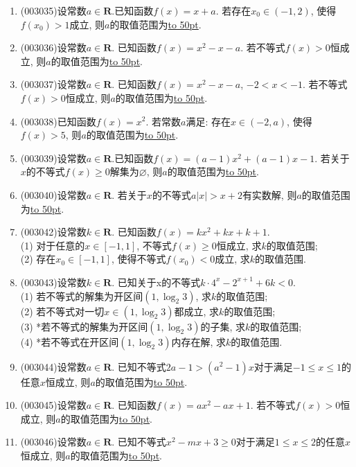 \documentclass[10pt,a4paper]{article}
\newcommand{\blank}[1]{\underline{\hbox to #1pt{}}}
\begin{document}
\begin{enumerate}[1.]
(2) 设常数$a\in \mathbf{R}$. 已知函数$f(x)=ax$, 若存在$x_0\in [-3,1]$, 使得不等式$f(x)+5<0$成立, 则$a$的取值范围为\blank{50};\\
(3) 设常数$a\in \mathbf{R}$. 已知函数$f(x)=ax$. 若对于任意$x\in (-3,1)$, 不等式$f(x)+5\ge 0$恒成立, 则$a$的取值范围为\blank{50}.
\item {\tiny (003035)}设常数$a\in \mathbf{R}$.已知函数$f(x)=x+a$. 若存在$x_0\in (-1,2)$, 使得$f(x_0)>1$成立, 则$a$的取值范围为\blank{50}.
\item {\tiny (003036)}设常数$a\in \mathbf{R}$. 已知函数$f(x)=x^2-x-a$. 若不等式$f(x)>0$恒成立, 则$a$的取值范围为\blank{50}.
\item {\tiny (003037)}设常数$a\in \mathbf{R}$. 已知函数$f(x)=x^2-x-a$, $-2<x<-1$. 若不等式$f(x)>0$恒成立, 则$a$的取值范围为\blank{50}.
\item {\tiny (003038)}已知函数$f(x)=x^2$. 若常数$a$满足: 存在$x\in (-2,a)$, 使得$f(x)>5$, 则$a$的取值范围为\blank{50}.
\item {\tiny (003039)}设常数$a\in \mathbf{R}$.已知函数$f(x)=(a-1)x^2+(a-1)x-1$. 若关于$x$的不等式$f(x)\ge 0$解集为$\varnothing$, 则$a$的取值范围为\blank{50}.
\item {\tiny (003040)}设常数$a\in \mathbf{R}$. 若关于$x$的不等式$a|x|>x+2$有实数解, 则$a$的取值范围为\blank{50}.
\item {\tiny (003042)}设常数$k\in \mathbf{R}$. 已知函数$f(x)=kx^2+kx+k+1$.\\
(1) 对于任意的$x\in [-1,1]$, 不等式$f(x)\ge 0$恒成立, 求$k$的取值范围;\\
(2) 存在$x_0\in [-1,1]$, 使得不等式$f(x_0)<0$成立, 求$k$的取值范围.
\item {\tiny (003043)}设常数$k\in \mathbf{R}$. 已知关于x的不等式$k\cdot 4^x-2^{x+1}+6k<0$.\\
(1) 若不等式的解集为开区间$(1, \log_2 3)$, 求$k$的取值范围;\\
(2) 若不等式对一切$x\in (1,\log_2 3)$都成立, 求$k$的取值范围;\\
(3) *若不等式的解集为开区间$(1,\log_2 3)$的子集, 求$k$的取值范围;\\
(4) *若不等式在开区间$(1,\log_2 3)$内存在解, 求$k$的取值范围.
\item {\tiny (003044)}设常数$a\in \mathbf{R}$. 已知不等式$2a-1>(a^2-1)x$对于满足$-1\le x\le 1$的任意$x$恒成立, 则$a$的取值范围为\blank{50}.
\item {\tiny (003045)}设常数$a\in \mathbf{R}$. 已知函数$f(x)=ax^2-ax+1$. 若不等式$f(x)>0$恒成立, 则$a$的取值范围为\blank{50}.
\item {\tiny (003046)}设常数$a\in \mathbf{R}$. 已知不等式$x^2-mx+3\ge 0$对于满足$1\le x\le 2$的任意$x$恒成立, 则$a$的取值范围为\blank{50}.

\end{enumerate}
\end{document}
